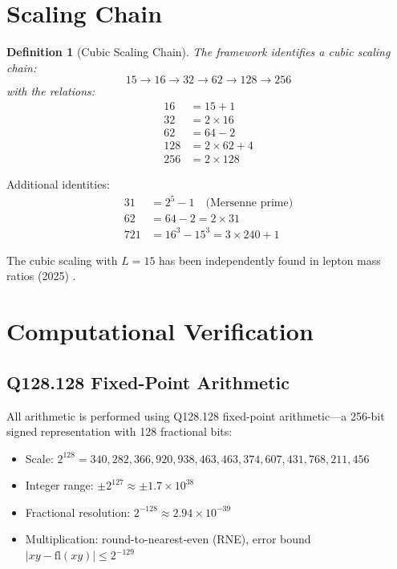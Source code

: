 \documentclass[11pt]{article}
\newtheorem{definition}{Definition}
\begin{document}
\section{Scaling Chain}

\begin{definition}[Cubic Scaling Chain]
The framework identifies a cubic scaling chain:
\begin{equation}
15 \to 16 \to 32 \to 62 \to 128 \to 256
\end{equation}
with the relations:
\begin{align}
16 &= 15 + 1 \\
32 &= 2 \times 16 \\
62 &= 64 - 2 \\
128 &= 2 \times 62 + 4 \\
256 &= 2 \times 128
\end{align}
\end{definition}

Additional identities:
\begin{align}
31 &= 2^5 - 1 \quad \text{(Mersenne prime)} \\
62 &= 64 - 2 = 2 \times 31 \\
721 &= 16^3 - 15^3 = 3 \times 240 + 1
\end{align}

The cubic scaling with $L = 15$ has been independently found in lepton mass ratios (2025) \cite{cubicscaling2025}.

\section{Computational Verification}

\subsection{Q128.128 Fixed-Point Arithmetic}

All arithmetic is performed using Q128.128 fixed-point arithmetic---a 256-bit signed representation with 128 fractional bits:
\begin{itemize}
\item Scale: $2^{128} = 340{,}282{,}366{,}920{,}938{,}463{,}463{,}374{,}607{,}431{,}768{,}211{,}456$
\item Integer range: $\pm 2^{127} \approx \pm 1.7 \times 10^{38}$
\item Fractional resolution: $2^{-128} \approx 2.94 \times 10^{-39}$
\item Multiplication: round-to-nearest-even (RNE), error bound $|xy - \text{fl}(xy)| \leq 2^{-129}$
\end{itemize}
\end{document}
